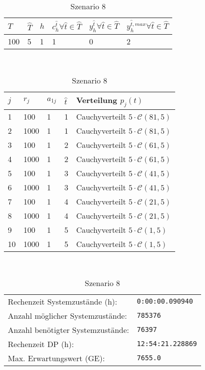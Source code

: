 \begin{table}[h!]
\renewcommand{\arraystretch}{1.5}
  \begin{center}
    \caption{Szenario 8}  \label{S8}
    \vspace*{3mm}
    \begin{tabular}{l l l l l l}   %
    $T$ & $\hat T$  & $h$ & $c_h^{\hat t}\forall \hat{t}\in{\hat T}$ & $y_h^{\hat t}\forall \hat{t}\in{\hat T}$  & $y_h^{{\hat t},max}\forall \hat{t}\in{\hat T}$  \\  \hline
100 & 5 & 1 & 1 & 0 & 2  \\ \hline
    \end{tabular} \\[3mm]
        \begin{tabular}{p{1cm} p{1cm} p{1cm}  p{1cm} p{6cm}}   %
    $j$ & $r_j$  & $a_{1j}$ & $\hat t$ & Verteilung $p_j(t)$ \\  \hline
1 & 100 & 1 & 1 & Cauchyverteilt $5\cdot\mathcal{C}(81, 5)$   \\
2 & 1000 & 1 & 1 & Cauchyverteilt $5\cdot\mathcal{C}(81, 5)$  \\
3 & 100 & 1 & 2 & Cauchyverteilt $5\cdot\mathcal{C}(61, 5)$  \\
4 & 1000 & 1 & 2 & Cauchyverteilt $5\cdot\mathcal{C}(61, 5)$  \\
5 & 100 & 1 & 3 & Cauchyverteilt $5\cdot\mathcal{C}(41, 5)$ \\
6 & 1000 & 1 & 3 & Cauchyverteilt $5\cdot\mathcal{C}(41, 5)$ \\
7 & 100 & 1 & 4 & Cauchyverteilt $5\cdot\mathcal{C}(21, 5)$  \\
8 & 1000 & 1 & 4 & Cauchyverteilt $5\cdot\mathcal{C}(21, 5)$  \\
9 & 100 & 1 & 5 & Cauchyverteilt $5\cdot\mathcal{C}(1, 5)$  \\
10 & 1000 & 1 & 5 & Cauchyverteilt $5\cdot\mathcal{C}(1, 5)$  \\ \hline
    \end{tabular} \\[3mm]
     \begin{tabular}{p{7cm}p{5cm}} \hline
     Rechenzeit Systemzustände (h): & \texttt{0:00:00.090940} \\
     Anzahl möglicher Systemzustände: & \texttt{785376} \\
     Anzahl benötigter Systemzustände: & \texttt{76397} \\ 
     Rechenzeit DP (h): & \texttt{12:54:21.228869} \\ 
          Max. Erwartungswert (GE): & \texttt{7655.0} \\ \hline
         \end{tabular} \\[3mm]
  \end{center}
\end{table}

